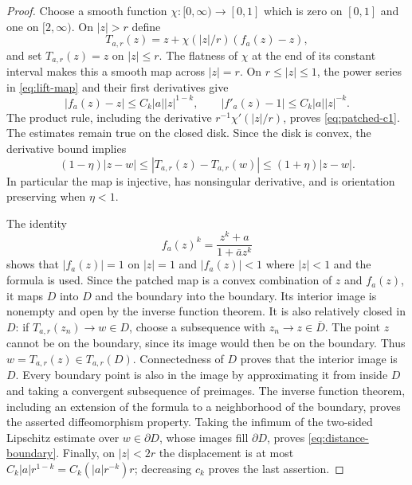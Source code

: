 \documentclass[11pt,a4paper]{article}
\numberwithin{equation}{section}
\theoremstyle{definition}
\theoremstyle{remark}
\begin{document}
\begin{proof}
Choose a smooth function $\chi:[0,\infty)\to[0,1]$ which is zero on
$[0,1]$ and one on $[2,\infty)$. On $|z|>r$ define
\[
 T_{a,r}(z)=z+\chi(|z|/r)(f_a(z)-z),
\]
and set $T_{a,r}(z)=z$ on $|z|\leq r$. The flatness of $\chi$ at the
end of its constant interval makes this a smooth map across $|z|=r$.
On $r\leq|z|\leq1$, the power series in \eqref{eq:lift-map} and their
first derivatives give
\[
 |f_a(z)-z|\leq C_k|a||z|^{1-k},\qquad
 |f'_a(z)-1|\leq C_k|a||z|^{-k}.
\]
The product rule, including the derivative $r^{-1}\chi'(|z|/r)$,
proves \eqref{eq:patched-c1}. The estimates remain true on the closed
disk. Since the disk is convex, the derivative bound implies
\[
 (1-\eta)|z-w|\leq |T_{a,r}(z)-T_{a,r}(w)|
 \leq(1+\eta)|z-w|.
\]
In particular the map is injective, has nonsingular derivative, and is
orientation preserving when $\eta<1$.

The identity
\begin{equation}
 f_a(z)^k=\frac{z^k+a}{1+\bar a z^k}
 \label{eq:power-mobius}
\end{equation}
shows that $|f_a(z)|=1$ on $|z|=1$ and $|f_a(z)|<1$ where $|z|<1$
and the formula is used. Since the patched map is a convex combination
of $z$ and $f_a(z)$, it maps $D$ into $D$ and the boundary into the
boundary. Its interior image is nonempty and open by the inverse
function theorem. It is also relatively closed in $D$: if
$T_{a,r}(z_n)\to w\in D$, choose a subsequence with
$z_n\to z\in\overline D$. The point $z$ cannot be on the boundary,
since its image would then be on the boundary. Thus
$w=T_{a,r}(z)\in T_{a,r}(D)$. Connectedness of $D$ proves that the
interior image is $D$. Every boundary point is also in the image by
approximating it from inside $D$ and taking a convergent subsequence
of preimages. The inverse function theorem, including an extension of
the formula to a neighborhood of the boundary, proves the asserted
diffeomorphism property.
Taking the infimum of the two-sided Lipschitz estimate over
$w\in\partial D$, whose images fill $\partial D$, proves
\eqref{eq:distance-boundary}. Finally, on $|z|<2r$ the displacement is
at most $C_k|a|r^{1-k}=C_k(|a|r^{-k})r$; decreasing $c_k$ proves the
last assertion.
\end{proof}
\end{document}
